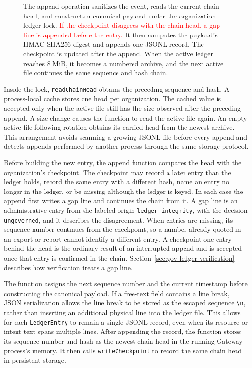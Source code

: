 \begin{figure}[htbp]
{\begin{tikzpicture}
\end{tikzpicture}%
}
\caption[Appending an entry to the HMAC-protected audit chain]
{\footnotesize The append operation sanitizes the event, reads the current
chain head, and constructs a canonical payload under the organization ledger
lock. \textcolor{red}{If the checkpoint disagrees with the chain head, a gap
line is appended before the entry.} It then computes the payload's HMAC-SHA256 digest and appends one JSONL
record. The checkpoint is updated after the append. When the active ledger
reaches 8 MiB, it becomes a numbered archive, and the next active file
continues the same sequence and hash chain.}
\label{fig:gov-ledger-append}
\end{figure}

Inside the lock, \texttt{readChainHead} obtains the preceding sequence and hash. A process-local cache stores one head per organization. The cached value is accepted only when the active file still has the size observed after the preceding append. A size change causes the function to read the active file again. An empty active file following rotation obtains its carried head from the newest archive. This arrangement avoids scanning a growing JSONL file before every append and detects appends performed by another process through the same storage protocol.

{\color{red}Before building the new entry, the append function compares the head with
the organization's checkpoint. The checkpoint may record a later entry than
the ledger holds, record the same entry with a different hash, name an entry no
longer in the ledger, or be missing although the ledger is keyed. In each case
the append first writes a gap line and continues the chain from it. A gap line
is an administrative entry from the labeled origin \texttt{ledger-integrity},
with the decision \texttt{ungoverned}, and it describes the disagreement. When
entries are missing, its sequence number continues from the checkpoint, so a
number already quoted in an export or report cannot identify a different
entry. A checkpoint one entry behind the head is the ordinary result of an
interrupted append and is accepted once that entry is confirmed in the chain.
Section~\ref{sec:gov-ledger-verification} describes how verification treats a
gap line.}

The function assigns the next sequence number and the current timestamp before constructing the canonical payload. If a free-text field contains a line break, JSON serialization allows the line break to be stored as the escaped sequence \texttt{\textbackslash n}, rather than inserting an additional physical line into the ledger file. This allows for each \texttt{LedgerEntry} to remain a single JSONL record, even when its resource or intent text spans multiple lines. After appending the record, the function stores its sequence number and hash as the newest chain head in the running Gateway process's memory. It then calls \texttt{writeCheckpoint} to record the same chain head in persistent storage.

